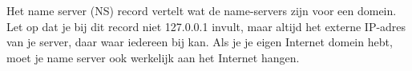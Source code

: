 Het name server (NS) record vertelt wat de name-servers zijn voor een domein. Let op dat je bij dit record niet 127.0.0.1 invult, maar altijd het externe IP-adres van je server, daar waar iedereen bij kan. Als je je eigen Internet domein hebt, moet je name server ook werkelijk aan het Internet hangen.

